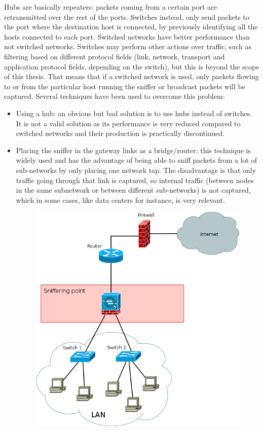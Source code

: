 \documentclass[thesis=M,english]{FITthesis}[2011/07/15]
\begin{document}
Hubs are basically repeaters: packets coming from a certain port are retransmitted over the rest of the ports.
Switches instead, only send packets to the port where the destination host is connected, by previously identifying all the hosts connected to each port. Switched networks have better performance than not switched networks. Switches may perform other actions over traffic, such as filtering based on different protocol fields (link, network, transport and application protocol fields, depending on the switch), but this is beyond the scope of this thesis.
That means that if a switched network is used, only packets flowing to or from the particular host running the sniffer or broadcast packets will be captured. Several techniques have been used to overcome this problem:
\begin{itemize}
\item Using a hub: an obvious but bad solution is to use hubs instead of switches. It is not a valid solution as its performance is very reduced compared to switched networks and their production is practically discontinued.
\item Placing the sniffer in the gateway links as a bridge/router: this technique is widely used and has the advantage of being able to sniff packets from a lot of sub-networks by only placing one network tap. The disadvantage is that only traffic going through that link is captured, so internal traffic (between nodes in the same subnetwork or between different sub-networks) is not captured, which in some cases, like data centers for instance, is very relevant. 
\begin{figure}[h]
\centering
\includegraphics[scale=0.6]{images/gateway_sniffering.png}

\end{figure}
\end{itemize}
\end{document}
